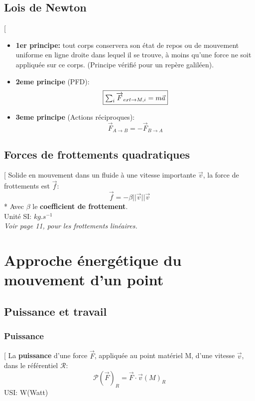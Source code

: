 \documentclass[12pt,hidelinks]{article}
\begin{document}
    \subsection{Lois de Newton}
        \begin{DashedDefinition}{}[
            \begin{itemize}
                \item \textbf{1er principe:} tout corps conservera son état de repos ou de mouvement uniforme en ligne droite dans lequel il se trouve, à moins qu'une force ne soit appliquée sur ce corps. (Principe vérifié pour un repère galiléen).
                \item \textbf{2eme principe} (PFD): \[\fbox{$\sum_i \overrightarrow{F}_{ext \rightarrow M,i} = m \vec a$}\]
                \item \textbf{3eme principe} (Actions réciproques): \[\overrightarrow{F}_{A \rightarrow B} = - \overrightarrow{F}_{B \rightarrow A}\]
            \end{itemize}
        \end{DashedDefinition}
        
    \subsection{Forces de frottements quadratiques}
        \begin{DashedDefinition}{}[
            Solide en mouvement dans un fluide à une vitesse importante $\overrightarrow{v}$, la force de frottements est $\overrightarrow{f}$:
            \[\overrightarrow{f}=-\beta ||\overrightarrow{v}|| \overrightarrow{v}\]
            * Avec $\beta$ le \textbf{coefficient de frottement}. \\
            Unité SI: \textbf{$kg.s^{-1}$} \\
            \textit{Voir page 11, pour les frottements linéaires.}
        \end{DashedDefinition}

\newpage
\section{Approche énergétique du mouvement d'un point}
\vspace{3cm}
    \subsection{Puissance et travail}
        \subsubsection{Puissance}
            \begin{DashedDefinition}{}[
                La \textbf{puissance} d'une force $\vec F$, appliquée au point matériel M, d'une vitesse $\vec v$, dans le référentiel \( \mathcal{R} \):
                \[ \mathcal{P}(\vec F)_R=\vec F \cdot \vec v (M)_R\]
                USI: W(Watt)
            \end{DashedDefinition}
\end{document}
